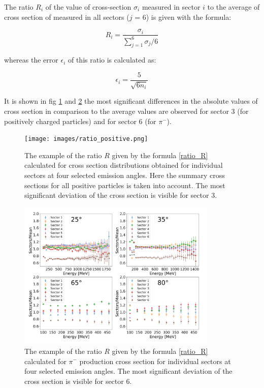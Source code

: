 The ratio $R_i$ of the value of cross-section $\sigma_i$  measured in sector $i$
to the average of cross section of measured in all sectors ($j$ = 6) is given with the formula:

\begin{equation}
\label{ratio_R}
R_i = \frac{\sigma_i}{\sum_{j=1}^{6} \sigma_j /6}    
\end{equation}

whereas the error $\epsilon_i$ of this ratio is calculated as: 

\begin{equation}
\label{ratio_R_error}
\epsilon_i = \frac{5}{\sqrt{6 n_i}}
\end{equation}

It is shown in fig \ref{ratio_pos} and \ref{ratio_neg}  
the most significant differences in the absolute values of cross section in comparison to the average values are observed for sector 3 (for positively charged particles) and for sector 6 (for $\pi^{-}$).

\begin{figure}
    \centering
    \texttt{[image: images/ratio\_positive.png]}%
    \caption{The example of the ratio $R$ given by the formula \ref{ratio_R} calculated for cross section distributions obtained for individual sectors at four selected emission angles. Here the summary cross sections for all positive particles is  taken into account. The most significant deviation of the cross section is visible for sector 3.}
    \label{ratio_pos}
\end{figure}

\begin{figure}
    \centering
    \includegraphics[width=0.85\textwidth]{images/ratio_negative.png}%
    \caption{The example of the ratio $R$ given by the formula \ref{ratio_R} calculated for $\pi^{-}$ production cross section for individual sectors at four selected emission angles. The most significant deviation of the cross section is visible for sector 6.}
    \label{ratio_neg}
\end{figure}

